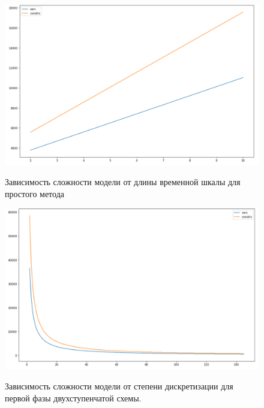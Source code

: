 \documentclass[12pt, twoside]{article}
\theoremstyle{definition}
\begin{document}
\begin{figure}[h]
\caption{Зависимость сложности модели от длины временной шкалы для простого метода}
\centering
\includegraphics[width=1.0\textwidth]{экспериментальные данные/simple discrete/зависимость от числа реакторов}
\label{fig:simple-reactor}
\end{figure}

\begin{figure}[h]
\caption{Зависимость сложности модели от степени дискретизации для первой фазы двухступенчатой схемы.}
\centering
\includegraphics[width=1.0\textwidth]{экспериментальные данные/two-phase/зависимость от дискретизации}
\label{fig:twophase}
\end{figure}
\end{document}
